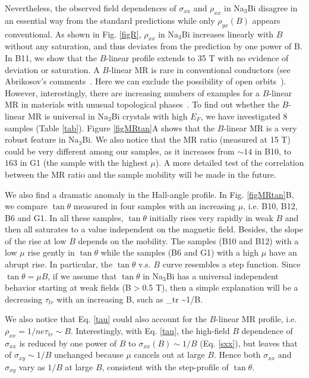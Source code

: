 Nevertheless, the observed field dependences of $\sigma_{xx}$ and $\rho_{xx}$ in Na$_3$Bi disagree in an essential way from the standard predictions while only $\rho_{yx}(B)$ appears conventional. As shown in Fig. \ref{figR}, $\rho_{xx}$ in Na$_3$Bi increases linearly with $B$ without any saturation, and thus deviates from the prediction by one power of B. In B11, we show that the $B$-linear profile extends to 35 T with no evidence of deviation or saturation. A $B$-linear MR is rare in conventional conductors (see Abrikosov's comments~\cite{Abrikosov1998}. Here we can exclude the possibility of open orbits~\cite{Ziman}). However, interestingly, there are increasing numbers of examples for a $B$-linear MR in materials with unusual topological phases~\cite{Qu,Liang2015}. To find out whether the $B$-linear MR is universal in Na$_3$Bi crystals with high $E_F$, we have investigated 8 samples (Table \ref{tab}). Figure \ref{figMRtan}A shows that the $B$-linear MR is a very robust feature in Na$_3$Bi. We also notice that the MR ratio (measured at 15 T) could be very different among our samples, as it increases from $\sim 14$ in B10, to $163$ in G1 (the sample with the highest $\mu$). A more detailed test of the correlation between the MR ratio and the sample mobility will be made in the future. 



We also find a dramatic anomaly in the Hall-angle profile. In Fig. \ref{figMRtan}B, we compare $\tan\theta$ measured in four samples with an increasing $\mu$, i.e. B10, B12, B6 and G1. In all these samples, $\tan\theta$ initially rises very rapidly in weak $B$ and then all saturates to a value independent on the magnetic field. Besides, the slope of the rise at low $B$ depends on the mobility. The samples (B10 and B12) with a low $\mu$ rise gently in $\tan\theta$ while the samples (B6 and G1) with a high $\mu$ have an abrupt rise. In particular, the $\tan\theta$ v.s. $B$ curve resembles a step function. Since $\tan\theta = \mu B$, if we assume that $\tan\theta$ in Na$_3$Bi has a universal independent behavior starting at weak fields (B$>$0.5 T), then a simple explanation will be a decreasing $\tau_{tr}$ with an increasing B, such as 
\be
\tau_{tr} \sim 1/B.
\label{tau}
\ee



We also notice that Eq. \ref{tau} could also account for the $B$-linear MR profile, i.e. 
$\rho_{xx} = 1/ne\tau_{tr} \sim B.$
Interestingly, with Eq. \ref{tau}, the high-field $B$ dependence of $\sigma_{xx}$ is reduced by one power of $B$ to $\sigma_{xx}(B)\sim 1/B$ (Eq. \ref{sxx}), but leaves that of $\sigma_{xy}\sim 1/B$ unchanged because $\mu$ cancels out at large $B$. Hence both $\sigma_{xx}$ and $\sigma_{xy}$ vary as $1/B$ at large $B$, consistent with the step-profile of $\tan\theta$. 


